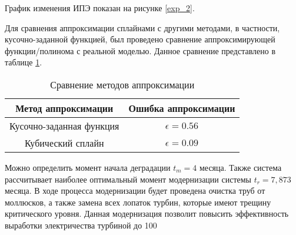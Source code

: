 
График изменения ИПЭ показан на рисунке \ref{exp_2}.


Для сравнения аппроксимации сплайнами с другими методами, в частности, кусочно-заданной функцией, был проведено сравнение аппроксимирующей функции/полинома с реальной моделью.
Данное сравнение представлено в таблице \ref{table:compare}.
\begin{table}[H]
    \caption{Сравнение методов аппроксимации}
    \centering 
    \label{table:compare}
    \begin{tabular}{|c|c|}
        \hline
        Метод аппроксимации  & Ошибка аппроксимации  \\
        \hline
        Кусочно-заданная функция & $\epsilon=0.56$ \\
        \hline
        Кубический сплайн & $\epsilon=0.09$ \\
        \hline
    \end{tabular}
    \end{table}

Можно определить момент начала деградации $t_m=4$ месяца. 
Также система рассчитывает наиболее оптимальный момент модернизации системы $t_r=7,873$ месяца.
В ходе процесса модернизации будет проведена очистка труб от моллюсков, а также замена всех лопаток турбин, которые имеют трещину критического уровня.
Данная модернизация позволит повысить эффективность выработки электричества турбиной до 100%



